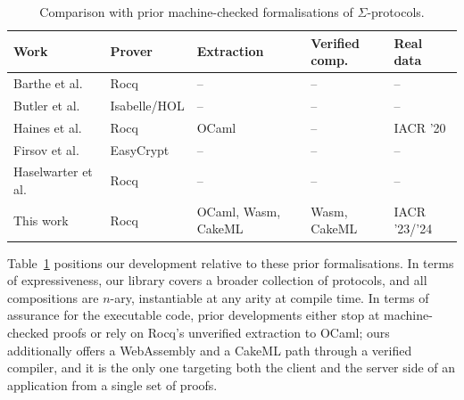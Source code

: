 \documentclass[sigconf,anonymous,review]{acmart}
\begin{document}
  

\begin{table}[b]
  \caption{Comparison with prior machine-checked formalisations of $\Sigma$-protocols.}
  \label{tab:comparison}
  \scriptsize
  \setlength{\tabcolsep}{2pt}
  \begin{tabular}{@{}lllll@{}}
    \toprule
    Work & Prover & Extraction & Verified comp. & Real data\\
    \midrule
    Barthe et al.~\cite{5552642} & Rocq & -- & -- & --\\
    Butler et al.~\cite{butler2021formalising} & Isabelle/HOL & -- & -- & --\\
    Haines et al.~\cite{287095} & Rocq & OCaml & -- & IACR '20\\
    Firsov et al.~\cite{10221929} & EasyCrypt & -- & -- & --\\
    Haselwarter et al.~\cite{10.1145/3594735} & Rocq & -- & -- & --\\
    This work & Rocq & OCaml, Wasm, CakeML & Wasm, CakeML & IACR '23/'24\\
    \bottomrule
  \end{tabular}
\end{table}

Table~\ref{tab:comparison} positions our development relative to these prior formalisations. In terms of expressiveness, our library covers a broader collection of protocols, and all compositions are $n$-ary, instantiable at any arity at compile time. In terms of assurance for the executable code, prior developments either stop at machine-checked proofs or rely on Rocq's unverified extraction to OCaml; ours additionally offers a WebAssembly and a CakeML path through a verified compiler, and it is the only one targeting both the client and the server side of an application from a single set of proofs.
\end{document}
